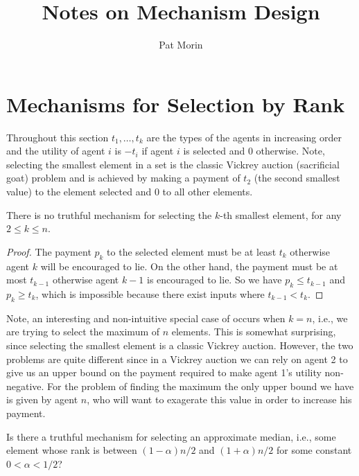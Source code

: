 \documentclass{article}
\title{Notes on Mechanism Design}
\author{Pat Morin}
\begin{document}
\maketitle

\section{Mechanisms for Selection by Rank}

Throughout this section $t_1,\ldots,t_k$ are the types of the agents
in increasing order and the utility of agent $i$ is $-t_i$ if agent
$i$ is selected and 0 otherwise.  Note, selecting the smallest element
in a set is the classic Vickrey auction (sacrificial goat) problem and
is achieved by making a payment of $t_2$ (the second smallest value) to
the element selected and 0 to all other elements.

\begin{thm}
There is no truthful mechanism for selecting the $k$-th smallest
element, for any $2\le k\le n$.
\end{thm}

\begin{proof} 
The payment $p_k$ to the selected element must be at least $t_k$
otherwise agent $k$ will be encouraged to lie.  On the other hand, the
payment must be at most $t_{k-1}$ otherwise agent $k-1$ is encouraged
to lie.  So we have $p_k \le t_{k-1}$ and $p_k \ge t_{k}$, which is
impossible because there exist inputs where $t_{k-1}<t_k$.  
\end{proof}

Note, an interesting and non-intuitive special case of
 occurs when $k=n$, i.e., we are trying to select
the maximum of $n$ elements.  This is somewhat surprising, since
selecting the smallest element is a classic Vickrey auction.  However,
the two problems are quite different since in a Vickrey auction we can
rely on agent 2 to give us an upper bound on the payment required to
make agent 1's utility non-negative.  For the problem of finding the
maximum the only upper bound we have is given by agent $n$, who will
want to exagerate this value in order to increase his payment.

\begin{op}
Is there a truthful mechanism for selecting an approximate median, i.e.,
some element whose rank is between $(1-\alpha)n/2$ and $(1+\alpha)n/2$
for some constant $0<\alpha < 1/2$?
\end{op}
\end{document}
